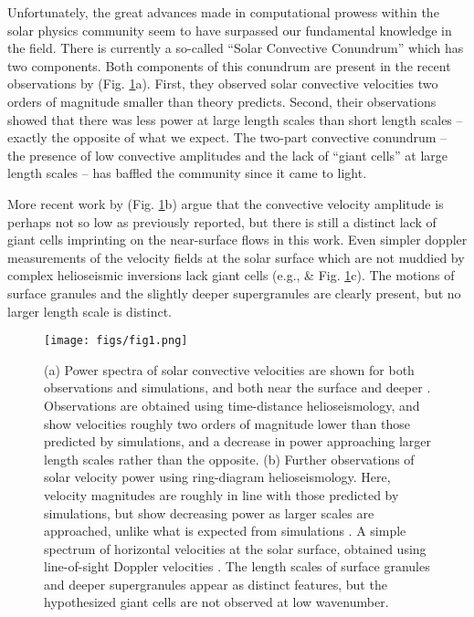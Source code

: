 \documentclass[aasms,12pt]{article}
\begin{document}
Unfortunately, the great advances made in computational prowess within the solar physics
community seem to have surpassed our fundamental knowledge in the field. There is currently
a so-called ``Solar Convective Conundrum'' which has two components.  Both components of
this conundrum are present in the recent observations
by \cite{hanasoge&all2012} (Fig. \ref{fig:fig1}a).  First, they observed solar convective velocities 
two orders of magnitude smaller than theory predicts. Second, their observations showed that there
was less power at large length scales than short length scales -- exactly the opposite of what
we expect.
The two-part convective conundrum -- the presence of low convective amplitudes
and the lack of ``giant cells'' at large length scales -- has baffled the community since it
came to light.

More recent work by \cite{greer&all2015} (Fig. \ref{fig:fig1}b) argue that the convective
velocity amplitude is perhaps not so low as previously reported, but there is still a distinct
lack of giant cells imprinting on the near-surface flows in this work.
Even simpler doppler measurements of the velocity fields at the solar surface which are not muddied
by complex helioseismic inversions lack
giant cells (e.g., \cite{hathaway&all2015} \& Fig. \ref{fig:fig1}c).  
The motions of surface granules and the slightly deeper supergranules are clearly present, but no
larger length scale is distinct.

\begin{figure}[t]
\centering
\texttt{[image: figs/fig1.png]}
\caption{(a) Power spectra of solar convective velocities are shown for both observations and simulations,
and both near the surface and deeper \cite{hanasoge&all2012}.  Observations are obtained
using time-distance helioseismology, and show velocities roughly two orders of magnitude lower
than those predicted by simulations, and a decrease in power approaching larger length
scales rather than the opposite. (b) Further observations of solar velocity power  using
ring-diagram helioseismology.  Here, velocity magnitudes are roughly in line with those
predicted by simulations, but show decreasing power as larger scales are approached, unlike
what is expected from simulations \cite{greer&all2015}.  A simple spectrum of horizontal
velocities at the solar surface, obtained using line-of-sight Doppler velocities \cite{hathaway&all2015}.
The length scales of surface granules and deeper supergranules appear as distinct features, but
the hypothesized giant cells are not observed at low wavenumber.
        \label{fig:fig1}}
\end{figure}
\end{document}
